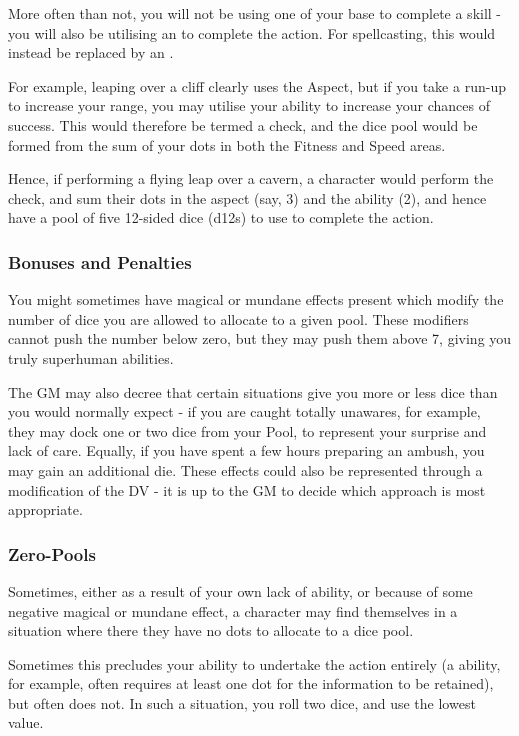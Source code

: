 More often than not, you will not be using one of your base  to complete a skill - you will also be utilising an  to complete the action. For spellcasting, this would instead be replaced by an . 

For example, leaping over a cliff clearly uses the  Aspect, but if you take a run-up to increase your range, you may utilise your  ability to increase your chances of success. This would therefore be termed a  check, and the dice pool would be formed from the sum of your dots in both the Fitness and Speed areas.

Hence, if performing a flying leap over a cavern, a character would perform the  check, and sum their dots in the  aspect (say, 3) and the  ability (2), and hence have a pool of five 12-sided dice (d12s) to use to complete the action. 

\subsubsection{Bonuses and Penalties}

You might sometimes have magical or mundane effects present which modify the number of dice you are allowed to allocate to a given pool. These modifiers cannot push the number below zero, but they may push them above 7, giving you truly superhuman abilities.

The GM may also decree that certain situations give you more or less dice than you would normally expect - if you are caught totally unawares, for example, they may dock one or two dice from your Pool, to represent your surprise and lack of care. Equally, if you have spent a few hours preparing an ambush, you may gain an additional die. These effects could also be represented through a modification of the DV - it is up to the GM to decide which approach is most appropriate.

\subsubsection{Zero-Pools}

Sometimes, either as a result of your own lack of ability, or because of some negative magical or mundane effect, a character may find themselves in a situation where there they have no dots to allocate to a dice pool. 

Sometimes this precludes your ability to undertake the action entirely (a  ability, for example, often requires at least one dot for the information to be retained), but often does not. In such a situation, you roll two dice, and use the lowest value. 


